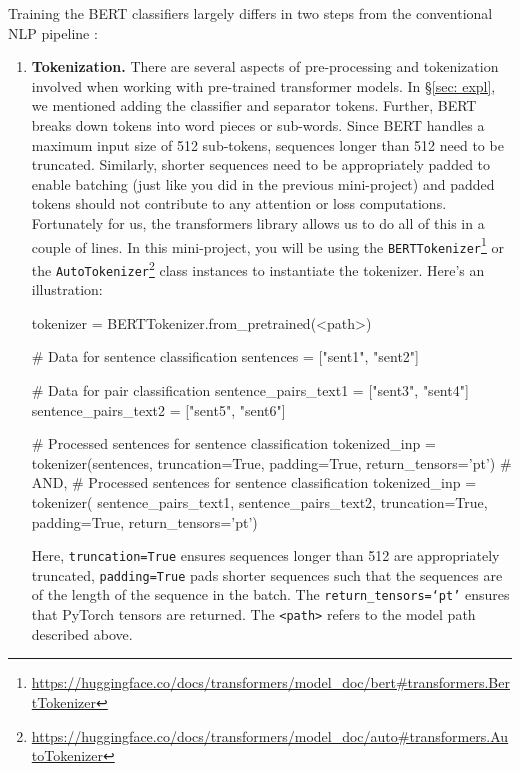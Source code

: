 Training the BERT classifiers largely differs in two steps from the conventional NLP pipeline :
\begin{enumerate}
    \item \textbf{Tokenization.} There are several aspects of pre-processing and tokenization involved when working with pre-trained transformer models. In \S{\ref{sec: expl}}, we mentioned adding the classifier and separator tokens. Further, BERT breaks down tokens into word pieces or sub-words. Since BERT handles a maximum input size of 512 sub-tokens, sequences longer than 512 need to be truncated. Similarly, shorter sequences need to be appropriately padded to enable batching (just like you did in the previous mini-project) and padded tokens should not contribute to any attention or loss computations. Fortunately for us, the transformers library allows us to do all of this in a couple of lines. In this mini-project, you will be using the \texttt{BERTTokenizer}\footnote{\url{https://huggingface.co/docs/transformers/model_doc/bert#transformers.BertTokenizer}} or the \texttt{AutoTokenizer}\footnote{\url{https://huggingface.co/docs/transformers/model_doc/auto#transformers.AutoTokenizer}} class instances to instantiate the tokenizer. Here's an illustration:
      \begin{python}
    tokenizer = BERTTokenizer.from_pretrained(<path>)

    # Data for sentence classification
    sentences = ["sent1", "sent2"]
    
    # Data for pair classification
    sentence_pairs_text1 =  ["sent3", "sent4"]
    sentence_pairs_text2 =  ["sent5", "sent6"]

    # Processed sentences for sentence classification
    tokenized_inp = tokenizer(sentences, truncation=True, padding=True, return_tensors='pt')
    # AND,
    # Processed sentences for sentence classification
    tokenized_inp = tokenizer( sentence_pairs_text1,  sentence_pairs_text2, truncation=True, padding=True, return_tensors='pt')
    
    \end{python} 

    Here, \texttt{truncation=True} ensures sequences longer than 512 are appropriately truncated, \texttt{padding=True} pads shorter sequences such that the sequences are of the length of the sequence in the batch. The \texttt{return\_tensors=`pt'} ensures that PyTorch tensors are returned. The \texttt{<path>} refers to the model path described above. 



\end{enumerate}
